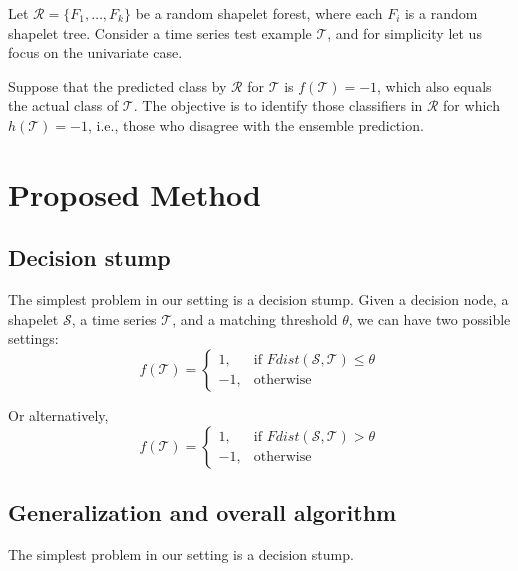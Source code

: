 \documentclass[smallextended,natbib]{svjour3}
\begin{document}
Let $\mathcal{R} = \{F_1, \dots, F_k\}$ be a random shapelet forest, where each $F_i$ is a random shapelet tree. Consider a time series test example $\mathcal{T}$, and for simplicity let us focus on the univariate case. 

Suppose that the predicted class by $\mathcal{R}$ for $\mathcal{T}$ is $f(\mathcal{T}) = -1$, which also equals the actual class of $\mathcal{T}$. The objective is to identify those classifiers in $\mathcal{R}$ for which $h(\mathcal{T}) = -1$, i.e., those who disagree with the ensemble prediction. 

\section{Proposed Method}

\subsection{Decision stump}
The simplest problem in our setting is a decision stump. Given a decision node, a shapelet $\mathcal{S}$, a time series $\mathcal{T}$, and a matching threshold $\theta$, we can have two possible settings:
\begin{equation}
f(\mathcal{T}) = 
\begin{cases}
    1,& \text{if } Fdist(\mathcal{S}, \mathcal{T}) \leq \theta\\
    -1,              & \text{otherwise}
\end{cases}
\end{equation}

Or alternatively, 
\begin{equation}
f(\mathcal{T}) = 
\begin{cases}
    1,& \text{if } Fdist(\mathcal{S}, \mathcal{T}) > \theta\\
    -1,              & \text{otherwise}
\end{cases}
\end{equation}

\subsection{Generalization and overall algorithm}
The simplest problem in our setting is a decision stump.



 

\end{document}
